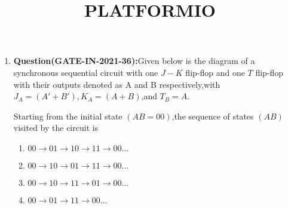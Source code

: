 \documentclass[12pt]{article}
\begin{document}
\title{\textbf{PLATFORMIO}}
\date{}
\maketitle
\begin{enumerate}
    \item \textbf{Question(GATE-IN-2021-36):}Given below  is the diagram of a synchronous sequential circuit with one $J-K$ flip-flop and one $T$ flip-flop with their outputs denoted as A and B respectively,with$J_A = (A'+B'),K_A = (A+B)$,and $T_B = A.$


\begin{figure}[H]
        \centering
	
        \caption{}
        \label{fig:fig:1}
\end{figure}

   
    Starting from the initial state $(AB=00)$,the sequence of states $(AB)$ visited by the circuit is
    \begin{enumerate}
	    \item $00\rightarrow01\rightarrow10\rightarrow11\rightarrow00 ...$
        \item $00\rightarrow10\rightarrow01\rightarrow11\rightarrow00 ...$
        \item $00\rightarrow10\rightarrow11\rightarrow01\rightarrow00 ...$
        \item $00\rightarrow01\rightarrow11\rightarrow00 ...$
    \end{enumerate}


\end{enumerate}
\end{document}
